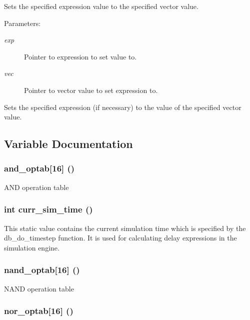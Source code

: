 Sets the specified expression value to the specified vector value.

\begin{Desc}
\item[Parameters: ]\par
\begin{description}
\item[{\em 
exp}]Pointer to expression to set value to. \item[{\em 
vec}]Pointer to vector value to set expression to.\end{description}
\end{Desc}
Sets the specified expression (if necessary) to the value of the specified vector value. 

\subsection{Variable Documentation}
\subsubsection{ and\_\-optab[16] ()}\label{expr_8c_a1}


AND operation table 
\subsubsection{\setlength{\rightskip}{0pt plus 5cm}int curr\_\-sim\_\-time ()}\label{expr_8c_a6}


This static value contains the current simulation time which is specified by the db\_\-do\_\-timestep function. It is used for calculating delay expressions in the simulation engine. 
\subsubsection{ nand\_\-optab[16] ()}\label{expr_8c_a3}


NAND operation table 
\subsubsection{ nor\_\-optab[16] ()}\label{expr_8c_a4}


